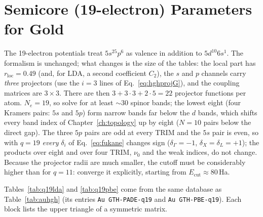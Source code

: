 \chapter{Semicore (19-electron) Parameters for Gold}
\label{app:q19}

The 19-electron potentials treat $5s^25p^6$ as valence in addition to
$5d^{10}6s^1$. The formalism is unchanged; what changes is the size of the
tables: the local part has $r_{\mathrm{loc}} = 0.49$ (and, for LDA, a
second coefficient $C_2$), the $s$ and $p$ channels carry \emph{three}
projectors (use the $i=3$ lines of Eq.~\eqref{eq:hghprojG}), and the
coupling matrices are $3\times3$. There are then $3 + 3\cdot3 + 2\cdot5 =
22$ projector functions per atom. $N_e = 19$, so solve for at least
$\sim 30$ spinor bands; the lowest eight (four Kramers pairs: $5s$ and
$5p$) form narrow bands far below the $d$ bands, which shifts every band
index of Chapter~\ref{ch:topology} up by eight ($N = 10$ pairs below the
direct gap). The three $5p$ pairs are odd at every TRIM and the $5s$ pair is
even, so with $q = 19$ \emph{every} $\delta_i$ of Eq.~\eqref{eq:fukane}
changes sign ($\delta_\Gamma = -1$, $\delta_X = \delta_L = +1$); the
products over eight and over four TRIM, $\nu_0$ and the weak indices, do
not change. Because the projector radii are much smaller, the cutoff must
be considerably higher than for $q = 11$: converge it explicitly, starting
from $E_{\mathrm{cut}}\approx 80$\,Ha.

Tables~\ref{tab:q19lda} and \ref{tab:q19pbe} come from the same database
as Table~\ref{tab:auhgh} (its entries \texttt{Au GTH-PADE-q19} and
\texttt{Au GTH-PBE-q19}). Each block lists the upper triangle of a
symmetric matrix.


